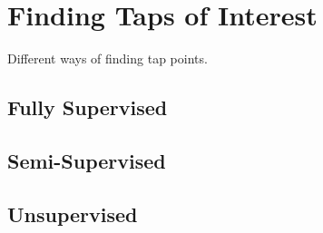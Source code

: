 \section{Finding Taps of Interest}
\label{sec:technical}

Different ways of finding tap points.

\subsection{Fully Supervised}

\subsection{Semi-Supervised}

\subsection{Unsupervised}

